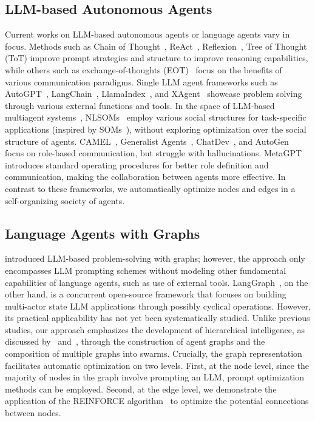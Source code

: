 \documentclass{article}
\theoremstyle{plain}
\theoremstyle{definition}
\theoremstyle{remark}
\begin{document}
\subsection{LLM-based Autonomous Agents}

Current works on LLM-based autonomous agents or language agents vary in focus. 
Methods such as Chain of Thought~\citep{wei2022chain}, ReAct~\citep{yao2022react}, Reflexion~\citep{shinn2023reflexion}, Tree of Thought (ToT) improve prompt strategies and structure to improve reasoning capabilities, while others such as exchange-of-thoughts (EOT)~\cite{yin2023exchange} focus on the benefits of various communication paradigms.
Single LLM agent frameworks such as AutoGPT~\citep{gravitas2023auto}, LangChain~\citep{Chase_LangChain_2022}, LlamaIndex~\citep{Liu_LlamaIndex_2022}, and XAgent~\citep{xagent2023} showcase problem solving through various external functions and tools. 
In the space of LLM-based multiagent systems~\citep{xie2023openagents,chen2023autoagents,chen2023agentverse}, NLSOMs~\citep{zhuge2023mindstorms} employ various social structures for task-specific applications (inspired by SOMs~\citep{minsky1988society}), without exploring optimization over the social structure of agents.
CAMEL~\citep{li2023camel}, Generalist Agents~\citep{park2023generative}, ChatDev~\citep{qian2023communicative}, and AutoGen~\citep{wu2023autogen} focus on role-based communication, but struggle with hallucinations.
MetaGPT~\citep{hong2023metagpt} introduces standard operating procedures for better role definition and communication, making the collaboration between agents more effective.
In contrast to these frameworks, we automatically optimize nodes and edges in a self-organizing society of agents. 

\subsection{Language Agents with Graphs}

\citet{besta2023graph} introduced LLM-based problem-solving with graphs; however, the approach only encompasses LLM prompting schemes without modeling other fundamental capabilities of language agents, such as use of external tools.
LangGraph~\citep{langgraph}, on the other hand, is a concurrent open-source framework that focuses on building multi-actor state LLM applications through possibly cyclical operations.
However, its practical applicability has not yet been systematically studied.
Unlike previous studies, our approach emphasizes the development of hierarchical intelligence, as discussed by~\citet{minsky1988society} and~\citet{kennedy2006swarm}, through the construction of agent graphs and the composition of multiple graphs into swarms.
Crucially, the graph representation facilitates automatic optimization on two levels.
First, at the node level, since the majority of nodes in the graph involve prompting an LLM, prompt optimization methods can be employed.
Second, at the edge level, we demonstrate the application of the REINFORCE algorithm~\citep{williams1992simple} to optimize the potential connections between nodes.
\end{document}
